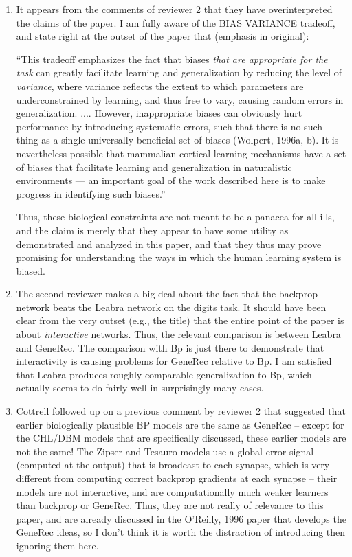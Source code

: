 \documentclass [11pt]{letter}
\begin{document}
\begin{letter}
\begin{enumerate}
\item It appears from the comments of reviewer 2 that they have
  overinterpreted the claims of the paper.  I am fully aware of the
  BIAS VARIANCE tradeoff, and state right at the outset of the paper
  that (emphasis in original):
  
  ``This tradeoff emphasizes the fact that biases {\em that are
    appropriate for the task} can greatly facilitate learning and
  generalization by reducing the level of {\em variance}, where
  variance reflects the extent to which parameters are
  underconstrained by learning, and thus free to vary, causing random
  errors in generalization.  .... However, inappropriate biases can
  obviously hurt performance by introducing systematic errors, such
  that there is no such thing as a single universally beneficial set
  of biases (Wolpert, 1996a, b).  It is nevertheless possible that
  mammalian cortical learning mechanisms have a set of biases that
  facilitate learning and generalization in naturalistic environments
  --- an important goal of the work described here is to make progress
  in identifying such biases.''
  
  Thus, these biological constraints are not meant to be a panacea for
  all ills, and the claim is merely that they appear to have some
  utility as demonstrated and analyzed in this paper, and that they
  thus may prove promising for understanding the ways in which the
  human learning system is biased.
  
\item The second reviewer makes a big deal about the fact that the
  backprop network beats the Leabra network on the digits task.  It
  should have been clear from the very outset (e.g., the title) that
  the entire point of the paper is about {\em interactive} networks.
  Thus, the relevant comparison is between Leabra and GeneRec.  The
  comparison with Bp is just there to demonstrate that interactivity
  is causing problems for GeneRec relative to Bp.  I am satisfied that
  Leabra produces roughly comparable generalization to Bp, which
  actually seems to do fairly well in surprisingly many cases.
  
\item Cottrell followed up on a previous comment by reviewer 2 that
  suggested that earlier biologically plausible BP models are the same
  as GeneRec -- except for the CHL/DBM models that are specifically
  discussed, these earlier models are not the same!  The Zipser and
  Tesauro models use a global error signal (computed at the output)
  that is broadcast to each synapse, which is very different from
  computing correct backprop gradients at each synapse -- their models
  are not interactive, and are computationally much weaker learners
  than backprop or GeneRec.  Thus, they are not really of relevance to
  this paper, and are already discussed in the O'Reilly, 1996 paper
  that develops the GeneRec ideas, so I don't think it is worth the
  distraction of introducing then ignoring them here.


\end{enumerate}
\end{letter}
\end{document}
